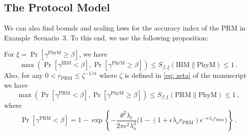 \documentclass[12pt, draftclsnofoot, onecolumn]{IEEEtran}
\begin{document}
\subsection{The Protocol Model}
We can also find bounds and scaling laws for the accuracy index of the PRM in Example~Scenario~3. To this end, we use the following proposition:
\begin{prop}
For $\xi = \Pr \left[ \gamma^{\mathrm{PhyM}} \geq \beta \right]$, we have
\begin{equation}\label{S-IBM-example3-bound-t}
\max\left(\Pr \left[\gamma^{\mathrm{IBM}}  < \beta \right] , \Pr \left[\gamma^{\mathrm{PhyM}} \geq \beta \right]\right) \leq S_{\beta,\xi}\left(\mathrm{IBM}\|\mathrm{PhyM} \right) \leq 1 \:.
\end{equation}
Also, for any $0 < r_{\mathrm{PRM}} \leq \zeta^{-1/\alpha}$ where $\zeta$ is defined in \eqref{eq: zeta} of the manuscript we have
\begin{equation}\label{eq: S-PRM-example3-bound-t}
\max\left(\Pr \left[\gamma^{\mathrm{PRM}}  < \beta \right] , \Pr \left[\gamma^{\mathrm{PhyM}} \geq \beta \right]\right) \leq S_{\beta,\xi}\left(\mathrm{PRM}\|\mathrm{PhyM} \right) \leq 1 \:,
\end{equation}
where
\begin{equation*}
\Pr \left[\gamma^{\mathrm{PRM}}  < \beta \right] = 1 - \exp\left\{- \frac{\theta^2 \lambda_t}{2\pi \epsilon^{2} \lambda_{o}^{2}} \Big( 1 - \left( 1 + \epsilon \lambda_o r_{\mathrm{PRM}} \right)e^{- \epsilon \lambda_o r_{\mathrm{PRM}}}\Big) \right\} \:.
\end{equation*}
\end{prop}
\end{document}

